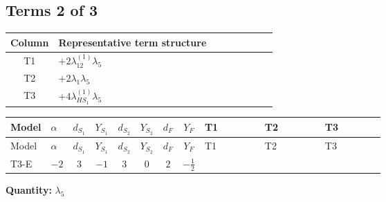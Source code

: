 \documentclass[8pt]{article}
\begin{document}
\begin{landscape}
\subsection*{Terms 2 of 3}
\begin{center}
\begin{tabular}{@{}c >{\raggedright\arraybackslash}p{0.82\linewidth}@{}}
\toprule
Column & Representative term structure \\
\midrule
T1 & \(\displaystyle +2 {\lambda_{12}^{(1)}} {\lambda_5}\) \\
\midrule
T2 & \(\displaystyle +2 {\lambda_1} {\lambda_5}\) \\
\midrule
T3 & \(\displaystyle +4 {\lambda_{HS_1}^{(1)}} {\lambda_5}\) \\
\midrule
\bottomrule
\end{tabular}
\end{center}
\smallskip
\tiny
\begin{longtable}{@{}llcccccc >{\raggedright\arraybackslash}p{0.21\linewidth} >{\raggedright\arraybackslash}p{0.21\linewidth} >{\raggedright\arraybackslash}p{0.21\linewidth}@{}}
\toprule
Model & $\alpha$ & $d_{S_1}$ & $Y_{S_1}$ & $d_{S_2}$ & $Y_{S_2}$ & $d_F$ & $Y_F$ & T1 & T2 & T3 \\
\midrule
\endfirsthead
\toprule
Model & $\alpha$ & $d_{S_1}$ & $Y_{S_1}$ & $d_{S_2}$ & $Y_{S_2}$ & $d_F$ & $Y_F$ & T1 & T2 & T3 \\
\midrule
\endhead
T3-E & $-2$ & $3$ & $-1$ & $3$ & $0$ & $2$ & $-\frac{1}{2}$ & \scriptsize\adjustbox{max width=\linewidth}{$\begin{gathered} +2 {\lambda_{12}^{(1)}} {\lambda_5}\end{gathered}$} & \scriptsize\adjustbox{max width=\linewidth}{$\begin{gathered} +2 {\lambda_1} {\lambda_5}\end{gathered}$} & \scriptsize\adjustbox{max width=\linewidth}{$\begin{gathered} +4 {\lambda_{HS_1}^{(1)}} {\lambda_5}\end{gathered}$} \\
\midrule
\bottomrule
\end{longtable}
\clearpage
\noindent\textbf{Quantity: }$\lambda_5$\par\smallskip

\end{landscape}
\end{document}
